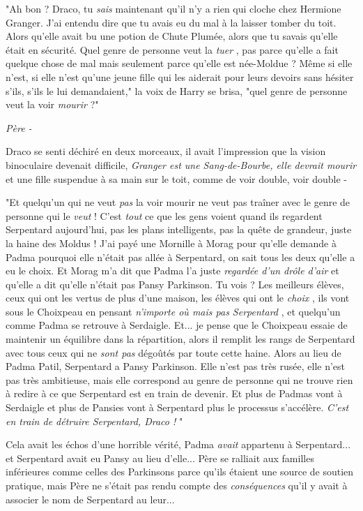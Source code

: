 "Ah bon ? Draco, tu \emph{sais}  maintenant qu'il n'y a rien qui cloche chez Hermione Granger. J'ai entendu dire que tu avais eu du mal à la laisser tomber du toit. Alors qu'elle avait bu une potion de Chute Plumée, alors que tu savais qu'elle était en sécurité. Quel genre de personne veut la \emph{tuer} , pas parce qu'elle a fait quelque chose de mal mais seulement parce qu'elle est née-Moldue ? Même si elle n'est, si elle n'est qu'une jeune fille qui les aiderait pour leurs devoirs sans hésiter s'ils, s'ils le lui demandaient," la voix de Harry se brisa, "quel genre de personne veut la voir \emph{mourir}  ?"

\emph{Père -} 

Draco se senti déchiré en deux morceaux, il avait l'impression que la vision binoculaire devenait difficile, \emph{Granger est une Sang-de-Bourbe, elle devrait mourir}  et une fille suspendue à sa main sur le toit, comme de voir double, voir double -

"Et quelqu'un qui ne veut \emph{pas}  la voir mourir ne veut pas traîner avec le genre de personne qui le \emph{veut}  ! C'est \emph{tout}  ce que les gens voient quand ils regardent Serpentard aujourd'hui, pas les plans intelligents, pas la quête de grandeur, juste la haine des Moldus ! J'ai payé une Mornille à Morag pour qu'elle demande à Padma pourquoi elle n'était pas allée à Serpentard, on sait tous les deux qu'elle a eu le choix. Et Morag m'a dit que Padma l'a juste \emph{regardée d'un drôle d'air}  et qu'elle a dit qu'elle n'était pas Pansy Parkinson. Tu vois ? Les meilleurs élèves, ceux qui ont les vertus de plus d'une maison, les élèves qui ont le \emph{choix} , ils vont sous le Choixpeau en pensant \emph{n'importe où mais pas Serpentard} , et quelqu'un comme Padma se retrouve à Serdaigle. Et... je pense que le Choixpeau essaie de maintenir un équilibre dans la répartition, alors il remplit les rangs de Serpentard avec tous ceux qui ne \emph{sont pas}  dégoûtés par toute cette haine. Alors au lieu de Padma Patil, Serpentard a Pansy Parkinson. Elle n'est pas très rusée, elle n'est pas très ambitieuse, mais elle correspond au genre de personne qui ne trouve rien à redire à ce que Serpentard est en train de devenir. Et plus de Padmas vont à Serdaigle et plus de Pansies vont à Serpentard plus le processus s'accélère. \emph{C'est en train de détruire Serpentard, Draco !} "

Cela avait les échos d'une horrible vérité, Padma \emph{avait}  appartenu à Serpentard... et Serpentard avait eu Pansy au lieu d'elle... Père se ralliait aux familles inférieures comme celles des Parkinsons parce qu'ils étaient une source de soutien pratique, mais Père ne s'était pas rendu compte des \emph{conséquences}  qu'il y avait à associer le nom de Serpentard au leur...

